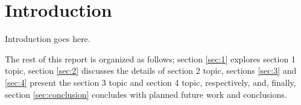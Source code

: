\section{Introduction}\label{sec:introduction}

Introduction goes here.

The rest of this report is organized as follows; section \ref{sec:1} explores
section 1 topic, section \ref{sec:2} discusses the details of section 2 topic,
sections \ref{sec:3} and \ref{sec:4} present the section 3 topic
and section 4 topic, respectively, and, finally, section \ref{sec:conclusion}
concludes with planned future work and conclusions.
